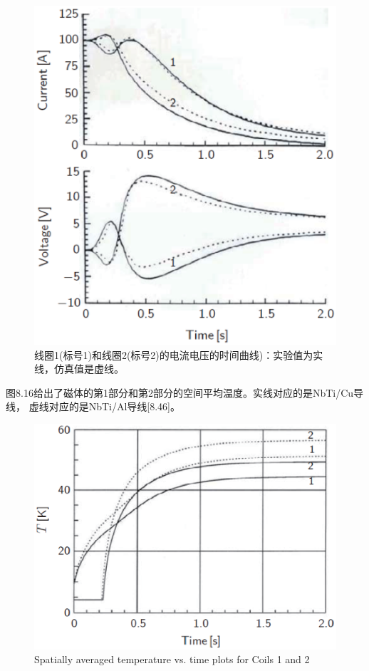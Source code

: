 \begin{figure}
	\centering
	\includegraphics[scale=0.6]{chpt8/figs/fig8.15.eps}
	\caption{线圈1(标号1)和线圈2(标号2)的电流电压的时间曲线)：实验值为实线，仿真值是虚线。 }
\end{figure}

图8.16给出了磁体的第1部分和第2部分的空间平均温度。实线对应的是NbTi/Cu导线，
虚线对应的是NbTi/Al导线[8.46]。

\begin{figure}
	\centering
	\includegraphics[scale=0.6]{chpt8/figs/fig8.16.eps}
	\caption{Spatially averaged temperature vs. time plots for Coils 1 and 2 }
\end{figure}




